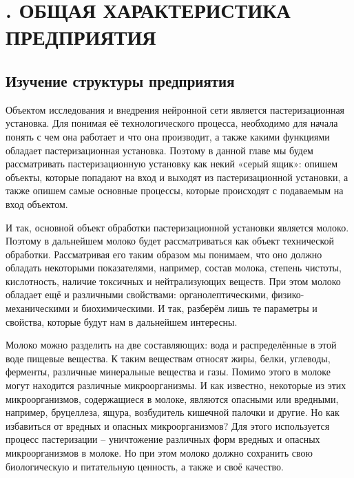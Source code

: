 \sectionbreak \section*{
  \gostTitleFont
  . ОБЩАЯ ХАРАКТЕРИСТИКА ПРЕДПРИЯТИЯ
}

\titlespace

\subsection*{ 
  \gostTitleFont
   Изучение структуры предприятия
} 

\subtitlespace

{\gostFont

  \par \redline Объектом исследования и внедрения нейронной сети является пастеризационная установка. Для понимая её технологического процесса, необходимо для начала понять с чем она работает и что она производит, а также какими функциями обладает пастеризационная установка. Поэтому в данной главе мы будем рассматривать пастеризационную установку как некий «серый ящик»: опишем объекты, которые попадают на вход и выходят из пастеризационной установки, а также опишем самые основные процессы, которые происходят с подаваемым на вход объектом. 

  \par \redline И так, основной объект обработки пастеризационной установки является молоко. Поэтому в дальнейшем молоко будет рассматриваться как объект технической обработки. Рассматривая его таким образом мы понимаем, что оно должно обладать некоторыми показателями, например, состав молока, степень чистоты, кислотность, наличие токсичных и нейтрализующих веществ. При этом молоко обладает ещё и различными свойствами: органолептическими, физико-механическими и биохимическими. И так, разберём лишь те параметры и свойства, которые будут нам в дальнейшем интересны.

  \par \redline Молоко можно разделить на две составляющих: вода и распределённые в этой воде пищевые вещества. К таким веществам относят жиры, белки, углеводы, ферменты, различные минеральные вещества и газы. Помимо этого в молоке могут находится различные микроорганизмы. И как известно, некоторые из этих микроорганизмов, содержащиеся в молоке, являются опасными или вредными, например, бруцеллеза, ящура, возбудитель кишечной палочки и другие. Но как избавиться от вредных и опасных микроорганизмов?  Для этого используется процесс пастеризации {--} уничтожение различных форм вредных и опасных микроорганизмов в молоке. Но при этом молоко должно сохранить свою биологическую и питательную ценность, а также и своё качество. 

}
